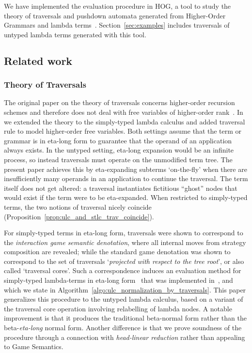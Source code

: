 \documentclass{elsarticle}
\theoremstyle{plain}
\theoremstyle{definition}
\begin{document}
 We have implemented the evaluation procedure in HOG, a tool to study the theory of traversals and pushdown automata generated from Higher-Order Grammars and lambda terms~\cite{BlumGalop2008,Blum-HogTool}.  Section~\ref{sec:examples} includes traversals of untyped lambda terms generated with this tool.

\subsection{Related work}

\subsubsection{Theory of Traversals}

The original paper on the theory of traversals concerns higher-order recursion schemes and therefore does not deal with free variables of higher-order rank~\cite{OngLics2006}. In~\cite{BlumPhd} we extended the theory to the simply-typed lambda calculus and added traversal rule to model higher-order free variables. Both settings assume that the term or grammar is in eta-long form to guarantee that the operand of an application always exists.
In the untyped setting, eta-long expansion would be an infinite process, so instead traversals must operate on the unmodified term tree.
The present paper achieves this by eta-expanding subterms `on-the-fly' when there are insufficiently many operands in an application to continue the traversal. The term itself does not get altered: a traversal instantiates fictitious ``ghost'' nodes that would exist if the term were to be eta-expanded.
When restricted to simply-typed terms, the two notions of traversal nicely coincide (Proposition~\ref{prop:ulc_and_stlc_trav_coincide}).

For simply-typed terms in eta-long form, traversals were shown to correspond to the \emph{interaction game semantic denotation}, where all internal moves from strategy composition are revealed; while the standard game denotation was shown to correspond to the set of traversals `\emph{projected with respect to the tree root}', or also called `traversal cores'. Such a correspondence induces an evaluation method for simply-typed lambda-terms in eta-long form~\cite{BlumPhd,BlumGalop2008,Ong-NormByTrav2015} that was implemented in~\cite{Blum-HogTool}, and which we state in Algorithm~\ref{algo:ulc_normalization_by_traversals}. This paper generalizes this procedure to the untyped lambda calculus, based on a variant of the traversal core operation involving relabelling of lambda nodes. A notable improvement is that it produces the traditional beta-normal form rather than the beta-\emph{eta-long} normal form. Another difference is that we prove soundness of the procedure through a connection with \emph{head-linear reduction} rather than appealing to Game Semantics.
\end{document}

